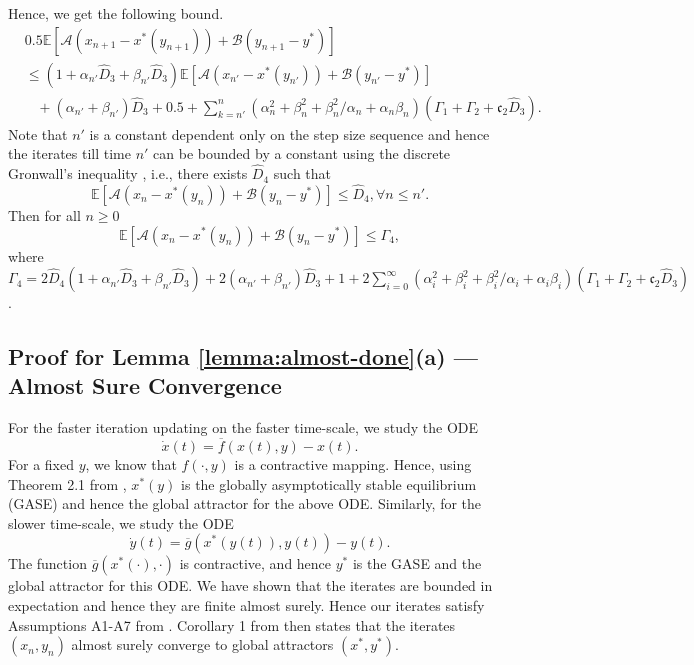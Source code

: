 \documentclass[letterpaper, 10 pt, conference]{ieeeconf}  %
\theoremstyle{definition}
\theoremstyle{plain}
\newcommand{\barf}{\overline{f}}
\newcommand{\barg}{\overline{g}}
\newcommand{\xstar}{x^*}
\newcommand{\ystar}{y^*}
\newcommand{\hD}{\hat{D}}
\newcommand{\EE}{\mathbb{E}}
\newcommand{\Acal}{\mathcal{A}}
\newcommand{\Bcal}{\mathcal{B}}
\newcommand{\cc}{\mathfrak{c}}
\begin{document}
     Hence, we get the following bound.
    \begin{align*}
        &0.5\EE[\Acal(x_{n+1}-\xstar(y_{n+1}))+\Bcal(y_{n+1}-\ystar)]\\
        &\leq  (1+\alpha_{n'}\hD_3+\beta_{n'}\hD_3)\EE[\Acal(x_{n'}-\xstar(y_{n'}))+\Bcal(y_{n'}-\ystar)]\\
        &\;\;\;+(\alpha_{n'}+\beta_{n'})\hD_3+0.5+\sum_{k=n'}^n(\alpha_n^2+\beta_n^2+\beta_n^2/\alpha_n+\alpha_n\beta_n)(\Gamma_1+\Gamma_2+\cc_2\hD_3).
    \end{align*}
    Note that $n'$ is a constant dependent only on the step size sequence and hence the iterates till time $n'$ can be bounded by a constant using the discrete Gronwall's inequality \cite{Borkar-book}, i.e., there exists $\hD_4$ such that $$\EE[\Acal(x_n-\xstar(y_n))+\Bcal(y_n-\ystar)]\leq \hD_4, \forall n\leq n'.$$ Then for all $n\geq 0$
    $$\EE[\Acal(x_{n}-\xstar(y_n))+\Bcal(y_{n}-\ystar)]\leq \Gamma_4,$$
    where $\Gamma_4=2\hD_4(1+\alpha_{n'}\hD_3+\beta_{n'}\hD_3)+2(\alpha_{n'}+\beta_{n'})\hD_3+1+2\sum_{i=0}^\infty(\alpha_i^2+\beta_i^2+\beta_i^2/\alpha_i+\alpha_i\beta_i)(\Gamma_1+\Gamma_2+\cc_2\hD_3)$.

\subsection{\textbf{Proof for Lemma \ref{lemma:almost-done}(a) --- Almost Sure Convergence}}
For the faster iteration updating on the faster time-scale, we study the ODE $$\dot{x}(t)=\barf(x(t),y)-x(t).$$ For a fixed $y$, we know that $f(\cdot,y)$ is a contractive mapping. Hence, using Theorem 2.1 from \cite{Borkar-book}, $\xstar(y)$ is the globally asymptotically stable equilibrium (GASE) and hence the global attractor for the above ODE. Similarly, for the slower time-scale, we study the ODE $$\dot{y}(t)=\barg(\xstar(y(t)),y(t))-y(t).$$ The function $\barg(\xstar(\cdot),\cdot)$ is contractive, and hence $\ystar$ is the GASE and the global attractor for this ODE. We have shown that the iterates are bounded in expectation and hence they are finite almost surely. Hence our iterates satisfy Assumptions A1-A7 from \cite{Karmakar-convergence}. Corollary 1 from \cite{Karmakar-convergence} then states that the iterates $(x_n,y_n)$ almost surely converge to global attractors $(\xstar,\ystar)$. 
\end{document}
